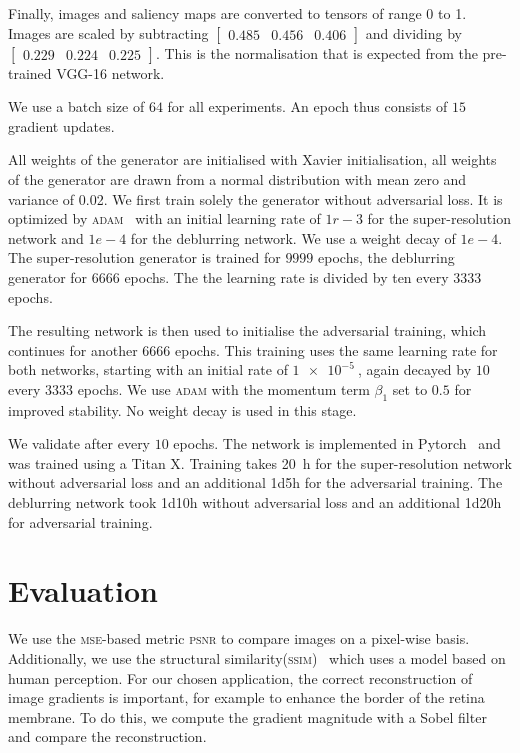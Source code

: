 \documentclass{scrartcl}
\begin{document}
Finally, images and saliency maps are converted to tensors of range 0 to 1.
Images are scaled by subtracting
\(
\begin{bmatrix}
 0.485 & 0.456 & 0.406 
\end{bmatrix}
\)
and dividing by
\(
\begin{bmatrix}
0.229 & 0.224& 0.225
\end{bmatrix}
\).
This is the normalisation that is expected from the pre-trained VGG-16 network.

We use a batch size of $64$ for all experiments.
An epoch thus consists of $15$ gradient updates.

All weights of the generator are initialised with Xavier initialisation, all weights of the generator are drawn from a normal distribution with mean zero and variance of 0.02. 
We first train solely the generator without adversarial loss.
It is optimized by \textsc{adam}~\cite{Adam} with an initial learning rate of $1r-3$ for the super-resolution network and $1e-4$ for the deblurring network.
We use a weight decay of $1e-4$.
The super-resolution generator is trained for $9999$ epochs, the deblurring generator for $6666$ epochs.
The the learning rate is divided by ten every $3333$ epochs.

The resulting network is then used to initialise the adversarial training, which continues for another $6666$ epochs.
This training uses the same learning rate for both networks, starting with an initial rate of $\SI{1e-5}{}$, again decayed by $10$ every $3333$ epochs.
We use \textsc{adam} with the momentum term $\beta_1$ set to $0.5$ for improved stability.
No weight decay is used in this stage.

We validate after every $10$ epochs.
The network is implemented in Pytorch~\cite{Pytorch} and was trained using a Titan X.
Training takes \SI{20}{\hour} for the super-resolution network without adversarial loss and an additional 1d5h for the adversarial training.
The deblurring network took 1d10h without adversarial loss and an additional 1d20h for adversarial training.

\section{Evaluation}
We use the \textsc{mse}-based metric \textsc{psnr} to compare images on a pixel-wise basis.
Additionally, we use the structural similarity(\textsc{ssim})~\cite{Ssim} which uses a model based on human perception.
For our chosen application, the correct reconstruction of image gradients is important, for example to enhance the border of the retina membrane.
To do this, we compute the gradient magnitude with a Sobel filter and compare the reconstruction.
\end{document}
